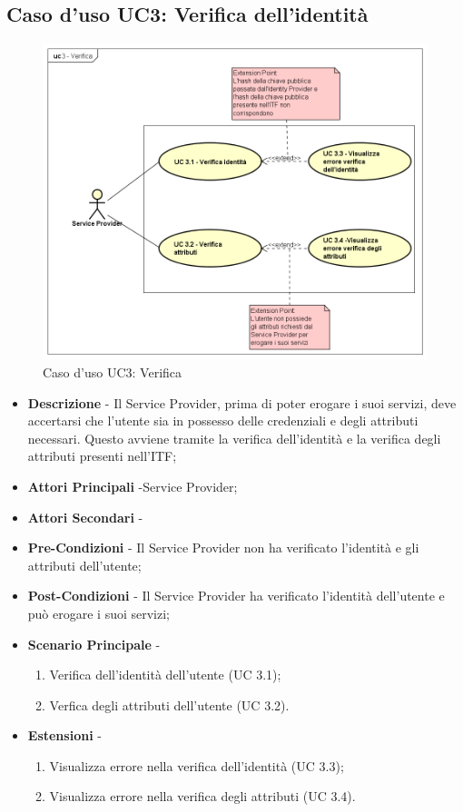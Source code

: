 \subsection{Caso d'uso UC3: Verifica dell'identità}
\begin{figure}[h]
	\centering
	\includegraphics[scale=0.50]{immagini/usecase/UC3_Verifica}
	\caption{Caso d'uso UC3: Verifica}
\end{figure}
\begin{itemize}
	\item \textbf{Descrizione} - Il Service Provider, prima di poter erogare i suoi servizi, deve accertarsi che l'utente sia in possesso delle credenziali e degli attributi necessari. Questo avviene tramite la verifica dell'identità e la verifica degli attributi presenti nell'\gls{ITF};
	\item \textbf{Attori Principali} -Service Provider;
	\item \textbf{Attori Secondari} -
	\item \textbf{Pre-Condizioni} - Il Service Provider non ha verificato l'identità e gli attributi dell'utente;
	\item \textbf{Post-Condizioni} - Il Service Provider ha verificato l'identità dell'utente e può erogare i suoi servizi;
	\item \textbf{Scenario Principale} -
	\begin{enumerate}
		\item Verifica dell'identità dell'utente (UC 3.1);
		\item Verfica degli attributi dell'utente (UC 3.2).
	\end{enumerate}
	\item \textbf{Estensioni} -
	\begin{enumerate}
		\item Visualizza errore nella verifica dell'identità (UC 3.3);
		\item Visualizza errore nella verifica degli attributi (UC 3.4).
	\end{enumerate}
\end{itemize}
